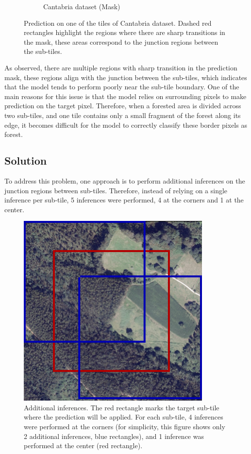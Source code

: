 \begin{figure}[H]
\begin{subfigure}{0.50\textwidth}
\caption{Cantabria dataset (Mask)}
\label{fig:right}
\end{subfigure}
\caption{Prediction on one of the tiles of Cantabria dataset. Dashed red rectangles highlight the regions where there are sharp transitions in the mask, these areas correspond to the junction regions between the sub-tiles.}
\label{fig:combined}
\end{figure}

As observed, there are multiple regions with sharp transition in the prediction mask, these regions align with the junction between the sub-tiles, which indicates that the model tends to perform poorly near the sub-tile boundary. One of the main reasons for this issue is that the model relies on surrounding pixels to make prediction on the target pixel. Therefore, when a forested area is divided across two sub-tiles, and one tile contains only a small fragment of the forest along its edge, it becomes difficult for the model to correctly classify these border pixels as forest. 
\newpage

\subsection{Solution}
To address this problem, one approach is to perform additional inferences on the junction regions between sub-tiles. Therefore, instead of relying on a single inference per sub-tile, 5 inferences were performed, 4 at the corners and 1 at the center.

\begin{figure}[H]
 \centering
 \includegraphics[scale=0.75]{IMAGENES/IMG19-Multi-inference.png}
 \captionsetup{font=large}
 \caption {Additional inferences. The red rectangle marks the target sub-tile where the prediction will be applied. For each sub-tile, 4 inferences were performed at the corners (for simplicity, this figure shows only 2 additional inferences, blue rectangles), and 1 inference was performed at the center (red rectangle).}
\end{figure}

